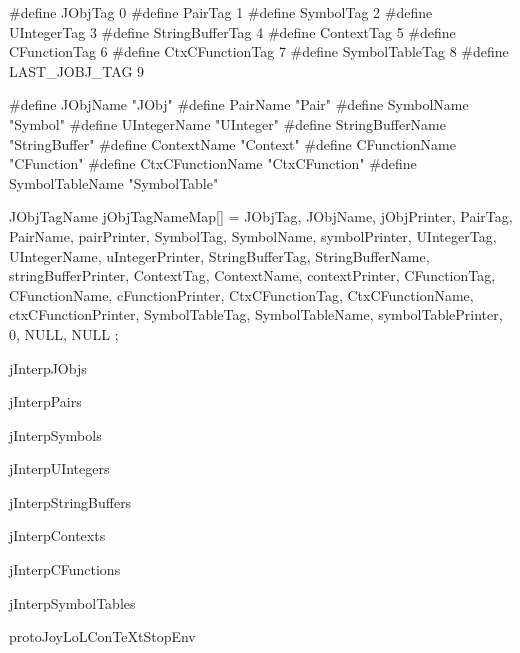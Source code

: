 \startCHeader
#define JObjTag         0
#define PairTag         1
#define SymbolTag       2
#define UIntegerTag     3
#define StringBufferTag 4
#define ContextTag      5
#define CFunctionTag    6
#define CtxCFunctionTag 7
#define SymbolTableTag  8
#define LAST_JOBJ_TAG   9

#define JObjName          "JObj"
#define PairName          "Pair"
#define SymbolName        "Symbol"
#define UIntegerName      "UInteger"
#define StringBufferName  "StringBuffer"
#define ContextName       "Context"
#define CFunctionName     "CFunction"
#define CtxCFunctionName  "CtxCFunction"
#define SymbolTableName   "SymbolTable"
\stopCHeader

\startCCode
JObjTagName jObjTagNameMap[] = {
  {JObjTag,         JObjName,         jObjPrinter},
  {PairTag,         PairName,         pairPrinter},
  {SymbolTag,       SymbolName,       symbolPrinter},
  {UIntegerTag,     UIntegerName,     uIntegerPrinter},
  {StringBufferTag, StringBufferName, stringBufferPrinter},
  {ContextTag,      ContextName,      contextPrinter},
  {CFunctionTag,    CFunctionName,    cFunctionPrinter},
  {CtxCFunctionTag, CtxCFunctionName, ctxCFunctionPrinter},
  {SymbolTableTag,  SymbolTableName,  symbolTablePrinter},
  {0,               NULL,             NULL}
};
\stopCCode

\diSimpComponent jInterpJObjs

\diSimpComponent jInterpPairs

\diSimpComponent jInterpSymbols

\diSimpComponent jInterpUIntegers

\diSimpComponent jInterpStringBuffers

\diSimpComponent jInterpContexts

\diSimpComponent jInterpCFunctions

\diSimpComponent jInterpSymbolTables

\diSimpEnvironment protoJoyLoLConTeXtStopEnv

\stopDiSimpComponent
